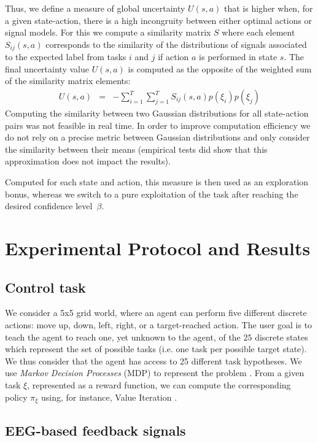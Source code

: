 \documentclass[letterpaper]{article}
\begin{document}
Thus, we define a measure of global uncertainty $U(s,a)$ that is higher when, for a given state-action, there is a high incongruity between either optimal actions or signal models. For this we compute a similarity matrix $S$ where each element $S_{ij}(s,a)$ corresponds to the similarity of the distributions of signals associated to the expected label from tasks $i$ and $j$ if action $a$ is performed in state $s$. The final uncertainty value $U(s,a)$ is computed as the opposite of the weighted sum of the similarity matrix elements:
%
\begin{eqnarray}
U(s,a) &=& - \sum_{i = 1}^{T} \sum_{j = 1}^{T} S_{ij}(s,a) p(\xi_i)p(\xi_j)
\end{eqnarray}
%
Computing the similarity between two Gaussian distributions for all state-action pairs was not feasible in real time. In order to improve computation efficiency we do not rely on a precise metric between Gaussian distributions and only consider the similarity between their means (empirical tests did show that this approximation does not impact the results).

Computed for each state and action, this measure is then used as an exploration bonus, whereas we switch to a pure exploitation of the task after reaching the desired confidence level~$\beta$.

\section{Experimental Protocol and Results}
\label{sec:results}

\subsection{Control task}
We consider a 5x5 grid world, where an agent can perform five different discrete actions: move up, down, left, right, or a target-reached action. The user goal is to teach the agent to reach one, yet unknown to the agent, of the $25$ discrete states which represent the set of possible tasks (i.e. one task per possible target state). We thus consider that the agent has access to 25 different task hypotheses. We use \textit{Markov Decision Processes} (MDP) to represent the problem \cite{sutton1998reinforcement}. From a given task $\xi$, represented as a reward function, we can compute the corresponding policy $\pi_{\xi}$ using, for instance, Value Iteration \cite{sutton1998reinforcement}. 

\subsection{EEG-based feedback signals}
\end{document}
